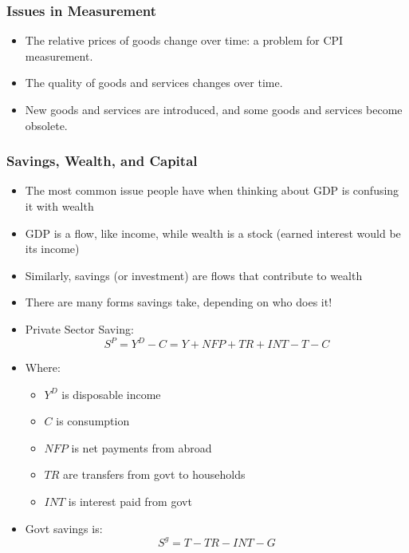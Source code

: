 \documentclass{beamer}
\begin{document}
    \begin{frame}
\frametitle[alignment=center]{Issues in Measurement}
\begin{itemize}
\item The relative prices of goods change over time: a problem for CPI measurement.
\bigskip
\item The quality of goods and services changes over time.
\bigskip
\item New goods and services are introduced, and some goods and services become obsolete.
\end{itemize}
\end{frame}

    \begin{frame}
\frametitle[alignment=center]{Savings, Wealth, and Capital}
\begin{itemize}
\item The most common issue people have when thinking about GDP is confusing it with wealth
\item GDP is a flow, like income, while wealth is a stock (earned interest would be its income)
\item Similarly, savings (or investment) are flows that contribute to wealth
\item There are many forms savings take, depending on who does it!
\item Private Sector Saving:
$$S^P=Y^D-C=Y+NFP+TR+INT-T-C$$
\item Where:
\begin{itemize}
\item $Y^D$ is disposable income
\item $C$ is consumption
\item $NFP$ is net payments from abroad
\item $TR$ are transfers from govt to households
\item $INT$ is interest paid from govt
\end{itemize}
\item Govt savings is:
$$S^g=T-TR-INT-G$$
\end{itemize}
\end{frame}
\end{document}
